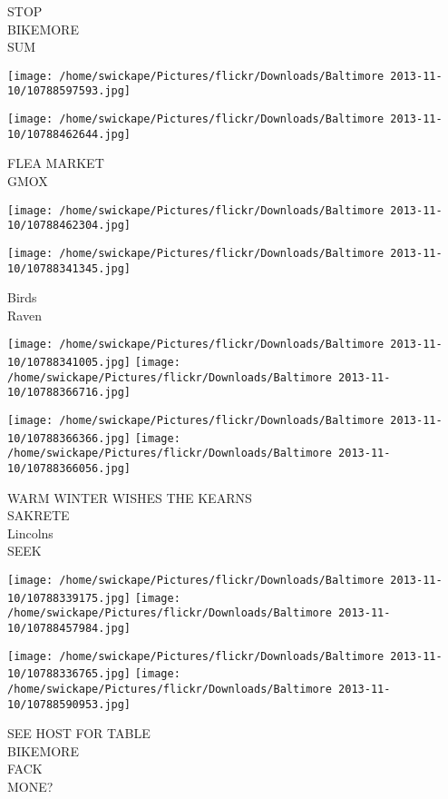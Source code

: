 \documentclass[10pt,letterpaper]{article}
\begin{document}
STOP\\
BIKEMORE\\
SUM
\pagebreak

\texttt{[image: /home/swickape/Pictures/flickr/Downloads/Baltimore 2013-11-10/10788597593.jpg]}

\vspace{0.25in}
\texttt{[image: /home/swickape/Pictures/flickr/Downloads/Baltimore 2013-11-10/10788462644.jpg]}

FLEA MARKET\\
GMOX
\pagebreak

\texttt{[image: /home/swickape/Pictures/flickr/Downloads/Baltimore 2013-11-10/10788462304.jpg]}

\vspace{0.25in}
\texttt{[image: /home/swickape/Pictures/flickr/Downloads/Baltimore 2013-11-10/10788341345.jpg]}

Birds\\
Raven
\pagebreak

\texttt{[image: /home/swickape/Pictures/flickr/Downloads/Baltimore 2013-11-10/10788341005.jpg]}
\texttt{[image: /home/swickape/Pictures/flickr/Downloads/Baltimore 2013-11-10/10788366716.jpg]}

\texttt{[image: /home/swickape/Pictures/flickr/Downloads/Baltimore 2013-11-10/10788366366.jpg]}
\texttt{[image: /home/swickape/Pictures/flickr/Downloads/Baltimore 2013-11-10/10788366056.jpg]}

WARM WINTER WISHES THE KEARNS\\
SAKRETE\\
Lincolns\\
SEEK
\pagebreak

\texttt{[image: /home/swickape/Pictures/flickr/Downloads/Baltimore 2013-11-10/10788339175.jpg]}
\texttt{[image: /home/swickape/Pictures/flickr/Downloads/Baltimore 2013-11-10/10788457984.jpg]}

\texttt{[image: /home/swickape/Pictures/flickr/Downloads/Baltimore 2013-11-10/10788336765.jpg]}
\texttt{[image: /home/swickape/Pictures/flickr/Downloads/Baltimore 2013-11-10/10788590953.jpg]}

SEE HOST FOR TABLE\\
BIKEMORE\\
FACK\\
MONE?
\pagebreak
\end{document}
